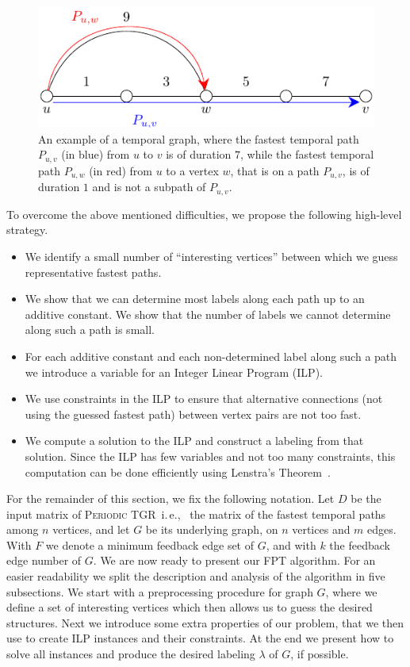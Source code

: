 \documentclass[a4paper,UKenglish,cleveref, autoref, thm-restate]{lipics-v2021}
\newcommand{\ie}{i.\,e.,\ }
\newcommand{\deltaExact}{\textsc{Periodic TGR}}
\begin{document}
	\begin{figure}[t]
    \centering
	\includegraphics{fig-motivationExample}
	\caption{An example of a temporal graph, where the fastest temporal path $P_{u,v}$ (in blue) from $u$ to $v$ is of duration $7$,
		while the fastest temporal path $P_{u,w}$ (in red) from $u$ to a vertex $w$, that is on a path $P_{u,v}$, is of duration $1$ and is not a subpath of $P_{u,v}$.		
		\label{fig:ftpExample}}
	\end{figure}

To overcome the above mentioned difficulties, we propose the following high-level strategy.
\begin{itemize}
    \item We identify a small number of ``interesting vertices'' between which we guess representative fastest paths.
    \item We show that we can determine most labels along each path up to an additive constant. We show that the number of labels we cannot determine along such a path is small. 
    \item For each additive constant and each non-determined label along such a path we introduce a variable for an Integer Linear Program (ILP). 
    \item We use constraints in the ILP to ensure that alternative connections (not using the guessed fastest path) between vertex pairs are not too fast.
    \item We compute a solution to the ILP and construct a labeling from that solution. Since the ILP has few variables and not too many constraints, this computation can be done efficiently using Lenstra's Theorem~\cite{Lenstra1983Integer}.
\end{itemize}


For the remainder of this section, we fix the following notation. 
Let $D$ be the input matrix of \deltaExact\ \ie
the matrix of the fastest temporal paths among $n$ vertices, and let $G$ be its underlying graph, on $n$ vertices and $m$ edges.
With $F$ we denote a minimum feedback edge set of $G$, and with $k$ the feedback edge number of $G$.
We are now ready to present our FPT algorithm. For an easier readability we split the description and analysis of the algorithm in five subsections.
We start with a preprocessing procedure for graph $G$, where we define a set of interesting vertices which then allows us to guess the desired structures.
Next we introduce some extra properties of our problem, that we then use to create ILP instances and their constraints.
At the end we present how to solve all instances and produce the desired labeling $\lambda$ of $G$, if possible.
\end{document}
